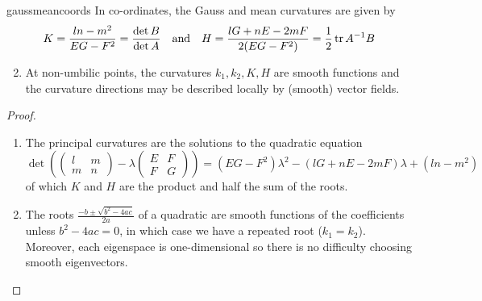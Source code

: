\begin{thm}{}{gaussmeancoords}
\exstart In co-ordinates, the Gauss and mean curvatures are given by
	\[K=\frac{ln-m^2}{EG-F^2}=\frac{\det B}{\det A}\quad\text{and}\quad H=\frac{lG+nE-2mF}{2(EG-F^2)} =\frac 12\operatorname{tr} A^{-1}B\]
\begin{enumerate}\setcounter{enumi}{1}
  \item At non-umbilic points, the curvatures $k_1,k_2,K,H$ are smooth functions and the curvature directions may be described locally by (smooth) vector fields.
\end{enumerate}
\end{thm}

\begin{proof}
\begin{enumerate}%
  \item The principal curvatures are the solutions to the quadratic equation
\[\det\left(\begin{pmatrix}l&m\\m&n\end{pmatrix}-\lambda\begin{pmatrix}E&F\\
F&G\end{pmatrix}\right) = (EG-F^2)\lambda^2-(lG+nE-2mF)\lambda+(ln-m^2)\]
	of which $K$ and $H$ are the product and half the sum of the roots. %
  \item The roots $\frac{-b\pm\sqrt{b^2-4ac}}{2a}$ of a quadratic are smooth functions of the coefficients unless $b^2-4ac=0$, in which case we have a repeated root ($k_1=k_2$). Moreover, each eigenspace is one-dimensional so there is no difficulty choosing smooth eigenvectors.\footnotemark\qedhere
\end{enumerate}
\end{proof}



